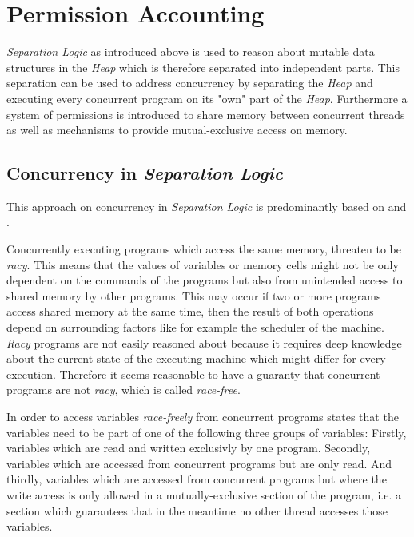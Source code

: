\section{Permission Accounting}

	\emph{Separation Logic} as introduced above is used to reason about mutable data
	structures in the \emph{Heap} which is therefore separated into independent
	parts. This separation can be used to address concurrency by separating
	the \emph{Heap} and executing every concurrent program on its "own" part
	of the \emph{Heap}. Furthermore a system of permissions is introduced to
	share memory between concurrent threads as well as mechanisms to provide
	mutual-exclusive access on memory. 

	\subsection{Concurrency in \emph{Separation Logic}}
	This approach on concurrency in \emph{Separation Logic} is predominantly
	based on \cite{ConcurrencyInSepLogic} and \cite{PermAcc}.

	Concurrently executing programs which access the same memory, threaten to
	be \emph{racy}. This means that the values of variables or memory cells might not
	be only dependent on the commands of the programs but also from unintended
	access to shared memory by other programs. This may occur if two or more
	programs access shared memory at the same time, then the result of both
	operations depend on surrounding factors like for example the scheduler of
	the machine. \emph{Racy} programs are not easily reasoned about because it requires
	deep knowledge about the current state of the executing machine which might
	differ for every execution. Therefore it seems reasonable to have a guaranty that
	concurrent programs are not \emph{racy}, which is called \emph{race-free}.

	In order to access variables \emph{race-freely} from concurrent programs
	\cite{PermAcc} states that the variables
	need to be part of one of the following three groups of variables:
	Firstly, variables which are read and written exclusivly by one
	program. Secondly, variables which are accessed from concurrent programs but
	are only read. And thirdly, variables which are accessed from concurrent
	programs but where the write access is only allowed in a mutually-exclusive
	section of the program, i.e. a section which guarantees that in the
	meantime no other thread accesses those variables.

